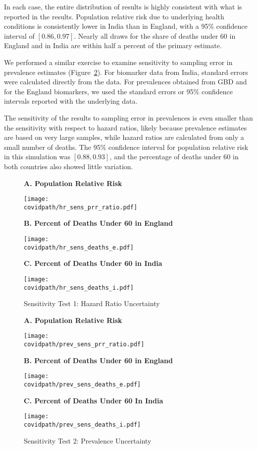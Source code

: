\documentclass[10pt,letterpaper]{article}
\numberwithin{equation}{section}
\begin{document}
In each case, the entire distribution of results is highly consistent with what is reported in the results. Population relative risk due to underlying health conditions is consistently lower in India than in England, with a 95\% confidence interval of $[0.86, 0.97]$. Nearly all draws for the share of deaths under 60 in England and in India are within half a percent of the primary estimate.

We performed a similar exercise to examine sensitivity to sampling error in prevalence estimates (Figure~\ref{fig:sens_prev}). For biomarker data from India, standard errors were calculated directly from the data. For prevalences obtained from GBD and for the England biomarkers, we used the standard errors or 95\% confidence intervals reported with the underlying data.

The sensitivity of the results to sampling error in prevalences is even smaller than the sensitivity with respect to hazard ratios, likely because prevalence estimates are based on very large samples, while hazard ratios are calculated from only a small number of deaths. The 95\% confidence interval for population relative risk in this simulation was $[0.88, 0.93]$, and the percentage of deaths under 60 in both countries also showed little variation.

\begin{figure}[H]
  \begin{center}
    \caption{Sensitivity Test 1: Hazard Ratio Uncertainty}
    \label{fig:sens_hr}
    
    \textbf{A. Population Relative Risk}
    
    \texttt{[image: \\covidpath/hr\_sens\_prr\_ratio.pdf]}

    \textbf{B. Percent of Deaths Under 60 in England}
    
    \texttt{[image: \\covidpath/hr\_sens\_deaths\_e.pdf]}

    \textbf{C. Percent of Deaths Under 60 in India}
    
    \texttt{[image: \\covidpath/hr\_sens\_deaths\_i.pdf]}
    
  \end{center}
\end{figure}

\begin{figure}[H]
  \begin{center}
    \caption{Sensitivity Test 2: Prevalence Uncertainty}
    \label{fig:sens_prev}
    
    \textbf{A. Population Relative Risk}
    
    \texttt{[image: \\covidpath/prev\_sens\_prr\_ratio.pdf]}

    \textbf{B. Percent of Deaths Under 60 in England}
    
    \texttt{[image: \\covidpath/prev\_sens\_deaths\_e.pdf]}

    \textbf{C. Percent of Deaths Under 60 In India}
    
    \texttt{[image: \\covidpath/prev\_sens\_deaths\_i.pdf]}
    
  \end{center}
\end{figure}
\end{document}
